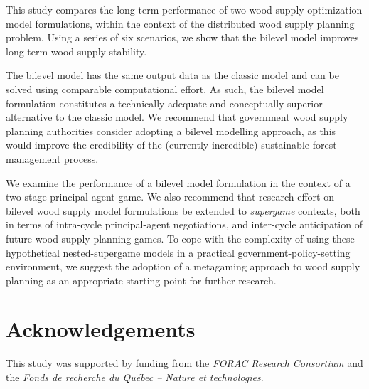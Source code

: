 This study compares the long-term performance of two wood supply optimization model formulations, within the context of the distributed wood supply planning problem. Using a series of six scenarios, we show that the bilevel model improves long-term wood supply stability. 

The bilevel model has the same output data as the classic model and can be solved using comparable computational effort. As such, the bilevel model formulation constitutes a technically adequate and conceptually superior alternative to the classic model.  We recommend that government wood supply planning authorities consider adopting a bilevel modelling approach, as this would improve the credibility of the (currently incredible) sustainable forest management process. 

We examine the performance of a bilevel model formulation in the context of a two-stage principal-agent game. We also recommend that research effort on bilevel wood supply model formulations be extended to \emph{supergame} contexts, both in terms of intra-cycle principal-agent negotiations, and inter-cycle anticipation of future wood supply planning games. To cope with the complexity of using these hypothetical nested-supergame models in a practical government-policy-setting environment, we suggest the adoption of a metagaming approach to wood supply planning as an appropriate starting point for further research. 

\section{Acknowledgements}
\label{sec:acknowledgements2}

This study was supported by funding from the \emph{FORAC Research
  Consortium} and the \emph{Fonds de recherche du Qu\'{e}bec -- Nature
  et technologies}. 


